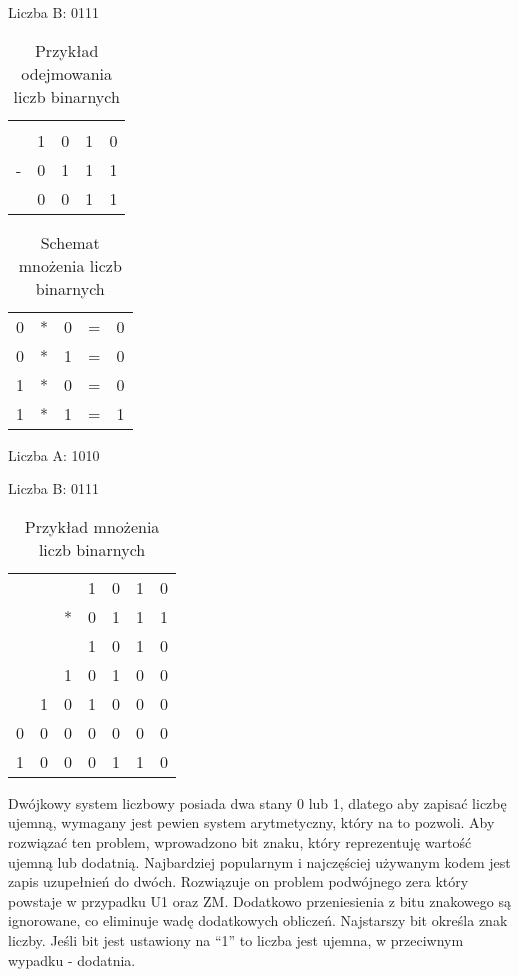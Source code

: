 \documentclass[12pt, a4paper, onside, polish]{article}				%
\begin{document}
Liczba B: 0111

\begin{table}[htb]
\caption{Przykład odejmowania liczb binarnych}
\centering
\begin{tabular}{lllll}
 &  &  &  &  \\
 & 1 & 0 & 1 & 0 \\
- & 0 & 1 & 1 & 1 \\ \hline
 & 0 & 0 & 1 & 1
\end{tabular}
\end{table}


\begin{table}[htb]
\caption{Schemat mnożenia liczb binarnych}
\centering
\begin{tabular}{lllll}
0 & * & 0 & = & 0 \\
0 & * & 1 & = & 0 \\
1 & * & 0 & = & 0 \\
1 & * & 1 & = & 1
\end{tabular}
\end{table}

Liczba A: 1010

Liczba B: 0111
\begin{table}[htb]
\caption{Przykład mnożenia liczb binarnych}
\centering
\begin{tabular}{lllllll}
 &  &  & 1 & 0 & 1 & 0 \\
 &  & * & 0 & 1 & 1 & 1 \\ \cline{3-7} 
 &  &  & 1 & 0 & 1 & 0 \\
 &  & 1 & 0 & 1 & 0 & 0 \\
 & 1 & 0 & 1 & 0 & 0 & 0 \\
0 & 0 & 0 & 0 & 0 & 0 & 0 \\ \hline
1 & 0 & 0 & 0 & 1 & 1 & 0 
\end{tabular}
\end{table}
\fi
Dwójkowy system liczbowy posiada dwa stany 0 lub 1, dlatego aby zapisać liczbę ujemną, wymagany jest pewien system arytmetyczny, który na to pozwoli. Aby rozwiązać ten problem, wprowadzono bit znaku, który reprezentuję wartość ujemną lub dodatnią. Najbardziej popularnym i najczęściej używanym kodem jest zapis uzupełnień do dwóch. Rozwiązuje on problem podwójnego zera który powstaje w przypadku U1 oraz ZM. Dodatkowo przeniesienia z bitu znakowego są ignorowane, co eliminuje wadę dodatkowych obliczeń. Najstarszy bit określa znak liczby. Jeśli bit jest ustawiony na “1” to liczba jest ujemna, w przeciwnym wypadku - dodatnia.   \newline
\end{document}

